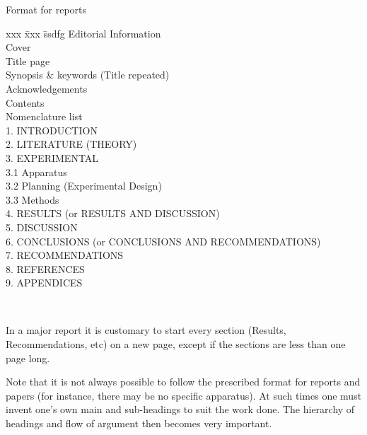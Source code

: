 \documentclass[a5paper, 10pt]{article}
\begin{document}
\begin{table}[htbp]
\begin{centering}
\caption[Format for reports]{Format for reports}
\label{tab:reportformat}

\begin{boxedminipage}[t]{0.8\textwidth}
  \begin{spacing}{1.8}
    \begin{tabbing}
      xxx \= xxx \= ssdfg \kill
      Editorial Information                                    \\
          \> Cover                                             \\
          \> Title page                                        \\
          \> Synopsis \& keywords (Title repeated)             \\
          \> Acknowledgements                                  \\
          \> Contents                                          \\
          \> Nomenclature list                                 \\
      1.  \> INTRODUCTION                                      \\
      2.  \> LITERATURE (THEORY)                               \\
      3.  \> EXPERIMENTAL                                      \\
      3.1 \> Apparatus                                         \\
      3.2 \> Planning (Experimental Design)                    \\
      3.3 \> Methods                                           \\
      4.  \> RESULTS  (or RESULTS AND DISCUSSION)              \\
      5.  \> DISCUSSION                                        \\
      6.  \> CONCLUSIONS  (or CONCLUSIONS AND RECOMMENDATIONS) \\
      7.  \> RECOMMENDATIONS                                   \\
      8.  \> REFERENCES                                        \\
      9.  \> APPENDICES
    \end{tabbing}
  \end{spacing}
\end{boxedminipage}                                            \\
\end{centering}
In a major report it is customary to start every section (Results,
Recommendations, etc) on a new page, except if the sections are less than one page long.\bigskip

Note that it is not always possible to follow the prescribed format for reports and papers (for instance, there may be no specific apparatus).  
At such times one must invent one's own main and sub-headings to suit the work done.  
The hierarchy of headings and flow of argument then becomes very important.
\end{table}
\end{document}
